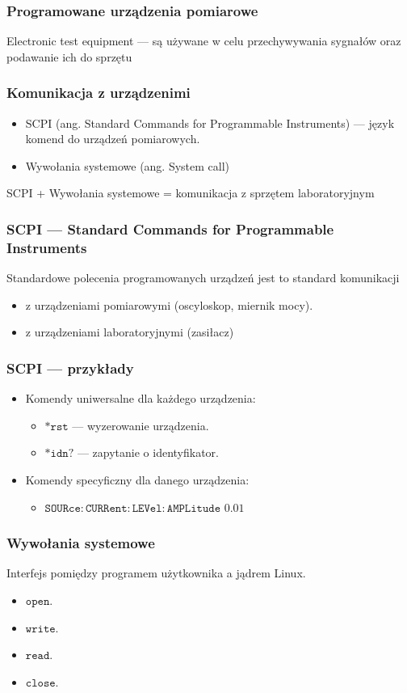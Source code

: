 \documentclass[xcolor={dvipsnames,table}]{beamer}
\begin{document}
\begin{frame}
\frametitle{Programowane urządzenia pomiarowe}
Electronic test equipment --- są używane w celu przechywywania sygnałów oraz podawanie ich do sprzętu
\end{frame}

\begin{frame}
\frametitle{Komunikacja z urządzenimi}
\begin{itemize}
\item SCPI (ang. Standard Commands for Programmable Instruments) --- język komend do urządzeń pomiarowych.
\item Wywołania systemowe (ang. System call)
\end{itemize}
SCPI + Wywołania systemowe = komunikacja z sprzętem laboratoryjnym
\end{frame}

\begin{frame}
\frametitle{SCPI --- Standard Commands for Programmable Instruments}
Standardowe polecenia programowanych urządzeń jest to standard komunikacji
\begin{itemize}
\item z urządzeniami pomiarowymi (oscyloskop, miernik mocy).
\item z urządzeniami laboratoryjnymi (zasiłacz)
\end{itemize} 
\end{frame}

\begin{frame}
\frametitle{SCPI --- przykłady}
\begin{itemize}
\item Komendy uniwersalne dla każdego urządzenia:
\begin{itemize}
\item $\mathtt{*rst}$ --- wyzerowanie urządzenia.
\item $\mathtt{*idn?}$ --- zapytanie o identyfikator.
\end{itemize}
\item Komendy specyficzny dla danego urządzenia:
\begin{itemize}
\item $\mathtt{SOURce:CURRent:LEVel:AMPLitude}$  $\mathtt{0.01}$
\end{itemize}
\end{itemize}
\end{frame}

\begin{frame}
\frametitle{Wywołania systemowe}
Interfejs pomiędzy programem użytkownika a jądrem Linux.
\begin{itemize}
\item $\mathtt{open}$.
\item $\mathtt{write}$.
\item $\mathtt{read}$.
\item $\mathtt{close}$.
\end{itemize}
\end{frame}
\end{document}
